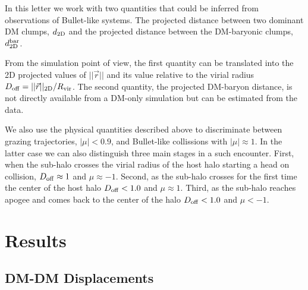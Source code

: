 \documentclass{emulateapj}
\begin{document}
In this letter we work with two quantities that could be inferred
from observations of Bullet-like systems. The projected distance
between two dominant DM clumps, $d_{\rm 2D}$ and the projected distance
between the DM-baryonic clumps, $d_{\rm 2D}^{\rm bar}$.

From the simulation point of view, the first quantity can be
translated into the 2D projected values of $||\vec{r}||$ and its value
relative to the virial radius $D_{\rm   off}= ||\vec{r}||_{\rm
  2D}/R_{\rm vir}$. The second quantity, the projected DM-baryon
distance, is not directly available from a DM-only simulation but can
be estimated from the data.  

We also use the physical quantities described above to discriminate
between grazing trajectories, $|\mu|<0.9$, and Bullet-like collissions
with $|\mu|\approx 1$. In the latter case we can also distinguish three
main stages in a such encounter. First, when the sub-halo crosses the
virial radius of the host halo starting a head on collision, $D_{\rm
  off} \approx 1$ and $\mu\approx -1$. Second, as the sub-halo crosses
for the first time the center of the host halo $D_{\rm off}<1.0$ and
$\mu\approx 1$. Third, as the sub-halo reaches apogee and comes back
to the center of the halo $D_{\rm off} < 1.0$ and $\mu< -1$.  


\section{Results}
\label{sec:results}

\subsection{DM-DM Displacements}
\label{fig:displacement}
\end{document}
